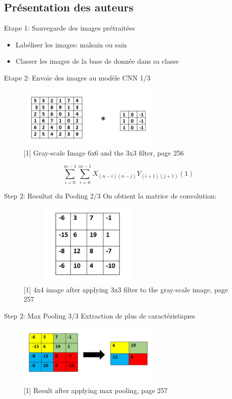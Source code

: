 \documentclass{beamer}
\begin{document}
\subsection{Présentation des auteurs}

\begin{frame}{Etape 1: Sauvegarde des images prétraitées}
\begin{itemize}
		\item  Labéliser les images: malsain ou sain
		\item Classer les images de la base de donnée dans sa classe
\end{itemize}
\end{frame} 

\begin{frame}{Etape 2: Envoie des images au modèle CNN 1/3}
\begin{figure}[H]
    \includegraphics[width=7cm,height=3cm]{images/convolution.png}
    \caption{[1] Gray-scale Image 6x6 and the 3x3 filter, page 256}
    \label{fig:L1}
\end{figure}
$$ \sum_{i=0}^{m-1}\sum_{i=0}^{m-1} X_{(n-i)(n-j)}Y_{(i+1)(j+1)}    (1)$$
\end{frame} 

\begin{frame}{Step 2: Resultat du Pooling 2/3}
On obtient la matrice de convolution:
\begin{figure}[H]
    \includegraphics[width=7cm,height=4cm]{images/pooling.png}
    \caption{[1] 4x4 image after applying 3x3 filter to the gray-scale image, page 257}
    \label{fig:L1}
\end{figure}
\end{frame} 

\begin{frame}{Step 2: Max Pooling 3/3}
Extraction de plus de caractéristiques
\begin{figure}[H]
    \includegraphics[width=7cm,height=3cm]{images/maxpooling.png}
    \caption{[1] Result after applying max pooling, page 257}
    \label{fig:L1}
\end{figure}
\end{frame} 
\end{document}

